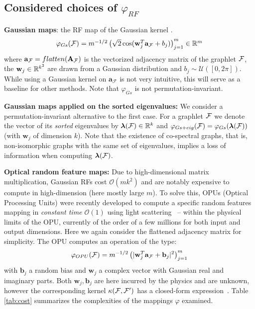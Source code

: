 \documentclass{article}
\begin{document}
\subsection{Considered choices of $\varphi_{RF}$}
\label{sec:phi_choices}
\textbf{Gaussian maps}: the RF map of the Gaussian kernel \cite{rahimi2008random}. 
\begin{equation}
\label{eq:Gaussian_map}
 \mathsmaller{\varphi_{Gs}(\F) = m^{-1/2} \left( \sqrt{2} \cos(\mathbf{w}_j^T\mathbf{a}_\F+b_j) \right)_{j=1}^m \in \mathbb{R}^m}
\end{equation}
where $\mathbf{a}_{\mathcal{F}}=flatten(\mathbf{A}_{\mathcal{F}})$ is the vectorized adjacency matrix of the graphlet $\mathcal{F}$, 
the $\mathbf{w}_j\in \mathbb{R}^{k^2}$ are drawn from a Gaussian distribution and $b_j \sim \mathcal{U}([0, 2\pi])$. While using a Gaussian kernel on $\mathbf{a}_\mathcal{F}$ is not very intuitive, this will serve as a baseline for other methods. Note that $\varphi_{Gs}$ is not permutation-invariant.

\noindent\textbf{Gaussian maps applied on the sorted eigenvalues:} We consider a permutation-invariant alternative to the first case. %
For a graphlet $\mathcal{F}$ we denote the vector of its \emph{sorted} eigenvalues by $\bm{\lambda}(\mathcal{F}) \in\mathbb{R}^k$ and $\varphi_{Gs+eig}(\mathcal{F}) = \varphi_{Gs}(\bm{\lambda}(\mathcal{F}))$ (with $\mathbf{w}_j$ of dimension $k$). Note that the existence of co-spectral graphs, that is, non-isomorphic graphs with the same set of eigenvalues, implies a loss of information when computing $\bm{\lambda}(\mathcal{F})$.

\noindent\textbf{Optical random feature maps:} Due to high-dimensional matrix multiplication, Gaussian RFs cost $\mathcal{O}(mk^2)$ and are notably expensive to compute in high-dimension (here mostly large $m$). To solve this, OPUs (Optical Processing Units) were recently developed to compute a specific random features mapping in \emph{constant time  $\mathcal{O}(1)$} using light scattering~\cite{saade_opu} -- within the physical limits of the OPU, currently of the order of a few millions for both input and output dimensions. Here we again consider the flattened adjacency matrix for simplicity. The OPU computes an operation of the type:
\[
\label{OPU_equation}
\mathbf{\varphi}_{OPU}(\mathcal{F})= m^{-1/2}\left(|\mathbf{w}_j^T \mathbf{a}_{\mathcal{F}}+\mathbf{b}_j|^2\right)_{j=1}^m
\]
with $\mathbf{b}_j$ a random bias and $\mathbf{w}_j$ a complex vector with Gaussian real and imaginary parts. Both $\mathbf{w}_j, \mathbf{b}_j$ are here incurred by the physics and are unknown, however the corresponding kernel $\kappa(\mathcal{F},\mathcal{F}')$ has a closed-form expression~\cite{saade_opu}.
%
Table \ref{tab:cost} summarizes the complexities of the mappings $\varphi$ examined.
\end{document}
